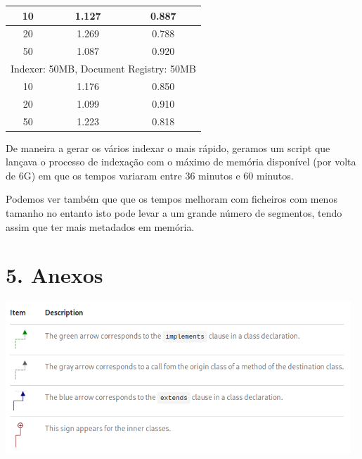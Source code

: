 \documentclass[12pt]{article}
\begin{document}
\begin{center}
\begin{tabular}{| c | c | c |}
        10
        & 1.127
        & 0.887 \\ \hline

        20
        & 1.269
        & 0.788 \\ \hline

        50
        & 1.087
        & 0.920 \\ \hline

        \multicolumn{3}{|c|}{Indexer: 50MB, Document Registry: 50MB} \\ \hline

        10
        & 1.176
        & 0.850 \\ \hline

        20
        & 1.099
        & 0.910 \\ \hline

        50
        & 1.223
        & 0.818 \\ \hline

    \end{tabular}
\end{center}

De maneira a gerar os vários indexar o mais rápido, geramos um script
que lançava o processo de indexação com o máximo de memória
disponível (por volta de 6G) em que os tempos variaram entre 36
minutos e 60 minutos.

Podemos ver também que que os tempos melhoram com ficheiros com menos
tamanho no entanto isto pode levar a um grande número de segmentos,
tendo assim que ter mais metadados em memória.

\newpage

\section*{5. Anexos}

\includegraphics[width=13cm]{arrow_legend.png}
\end{document}
